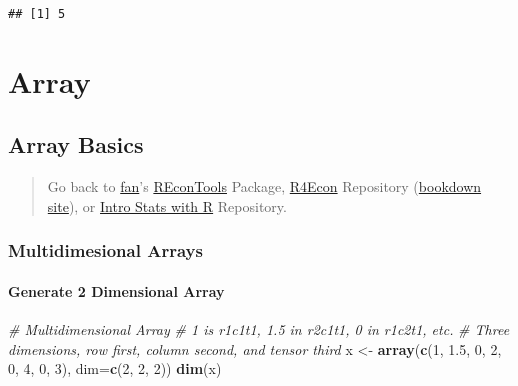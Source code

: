 \documentclass[
]{book}
\newenvironment{Shaded}{\begin{snugshade}}{\end{snugshade}}
\newcommand{\CommentTok}[1]{\textcolor[rgb]{0.56,0.35,0.01}{\textit{#1}}}
\newcommand{\DataTypeTok}[1]{\textcolor[rgb]{0.13,0.29,0.53}{#1}}
\newcommand{\DecValTok}[1]{\textcolor[rgb]{0.00,0.00,0.81}{#1}}
\newcommand{\FloatTok}[1]{\textcolor[rgb]{0.00,0.00,0.81}{#1}}
\newcommand{\KeywordTok}[1]{\textcolor[rgb]{0.13,0.29,0.53}{\textbf{#1}}}
\newcommand{\NormalTok}[1]{#1}
\newcommand{\StringTok}[1]{\textcolor[rgb]{0.31,0.60,0.02}{#1}}
\begin{document}
\begin{verbatim}
## [1] 5
\end{verbatim}

\hypertarget{array}{%
\section{Array}\label{array}}

\hypertarget{array-basics}{%
\subsection{Array Basics}\label{array-basics}}

\begin{quote}
Go back to \href{http://fanwangecon.github.io/CodeDynaAsset/}{fan}'s \href{https://fanwangecon.github.io/REconTools/}{REconTools} Package, \href{https://fanwangecon.github.io/R4Econ/}{R4Econ} Repository (\href{https://fanwangecon.github.io/R4Econ/bookdown}{bookdown site}), or \href{https://fanwangecon.github.io/Stat4Econ/}{Intro Stats with R} Repository.
\end{quote}

\hypertarget{multidimesional-arrays}{%
\subsubsection{Multidimesional Arrays}\label{multidimesional-arrays}}

\hypertarget{generate-2-dimensional-array}{%
\paragraph{Generate 2 Dimensional Array}\label{generate-2-dimensional-array}}

\begin{Shaded}
\begin{Highlighting}[]
\CommentTok{# Multidimensional Array}
\CommentTok{# 1 is r1c1t1, 1.5 in r2c1t1, 0 in r1c2t1, etc.}
\CommentTok{# Three dimensions, row first, column second, and tensor third}
\NormalTok{x <-}\StringTok{ }\KeywordTok{array}\NormalTok{(}\KeywordTok{c}\NormalTok{(}\DecValTok{1}\NormalTok{, }\FloatTok{1.5}\NormalTok{, }\DecValTok{0}\NormalTok{, }\DecValTok{2}\NormalTok{, }\DecValTok{0}\NormalTok{, }\DecValTok{4}\NormalTok{, }\DecValTok{0}\NormalTok{, }\DecValTok{3}\NormalTok{), }\DataTypeTok{dim=}\KeywordTok{c}\NormalTok{(}\DecValTok{2}\NormalTok{, }\DecValTok{2}\NormalTok{, }\DecValTok{2}\NormalTok{))}
\KeywordTok{dim}\NormalTok{(x)}
\end{Highlighting}
\end{Shaded}
\end{document}
